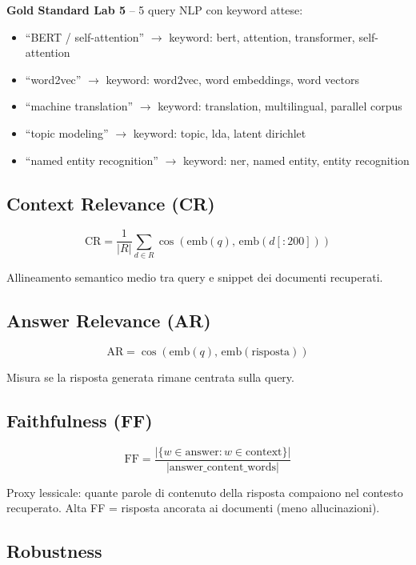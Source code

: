 \documentclass[12pt,a4paper]{article}
\begin{document}
\textbf{Gold Standard Lab 5} -- 5 query NLP con keyword attese:
\begin{itemize}
  \item ``BERT / self-attention'' $\to$ keyword: bert, attention, transformer, self-attention
  \item ``word2vec'' $\to$ keyword: word2vec, word embeddings, word vectors
  \item ``machine translation'' $\to$ keyword: translation, multilingual, parallel corpus
  \item ``topic modeling'' $\to$ keyword: topic, lda, latent dirichlet
  \item ``named entity recognition'' $\to$ keyword: ner, named entity, entity recognition
\end{itemize}

\subsection{Context Relevance (CR)}

\begin{formulabox}
\[
\text{CR} = \frac{1}{|R|} \sum_{d \in R} \cos\!\left(\text{emb}(q),\, \text{emb}(d[:200])\right)
\]
\end{formulabox}
Allineamento semantico medio tra query e snippet dei documenti recuperati.

\subsection{Answer Relevance (AR)}

\begin{formulabox}
\[
\text{AR} = \cos\!\left(\text{emb}(q),\, \text{emb}(\text{risposta})\right)
\]
\end{formulabox}
Misura se la risposta generata rimane centrata sulla query.

\subsection{Faithfulness (FF)}

\begin{formulabox}
\[
\text{FF} = \frac{|\{w \in \text{answer}: w \in \text{context}\}|}{|\text{answer\_content\_words}|}
\]
\end{formulabox}
Proxy lessicale: quante parole di contenuto della risposta compaiono nel contesto recuperato. Alta FF = risposta ancorata ai documenti (meno allucinazioni).

\subsection{Robustness}
\end{document}
